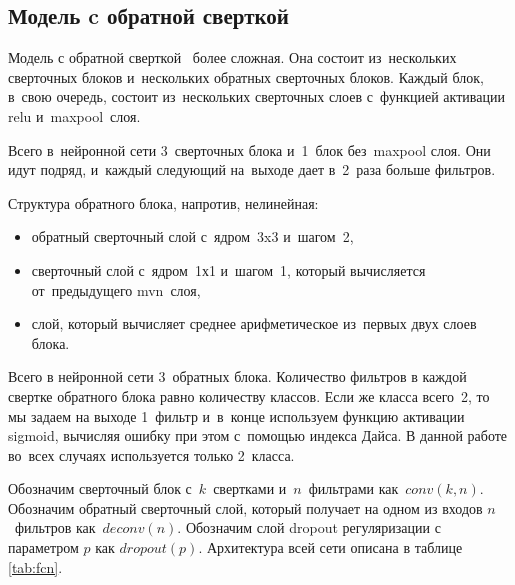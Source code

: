 \subsection{Модель c обратной сверткой}
 
Модель с обратной сверткой~\cite{fcn} более сложная. Она состоит из~нескольких сверточных блоков и~нескольких обратных сверточных блоков. Каждый блок, в~свою очередь, состоит из~нескольких сверточных слоев с~функцией активации relu и~maxpool~слоя. 

Всего в~нейронной сети 3~сверточных блока и~1~блок без~maxpool слоя. Они идут подряд, и~каждый следующий на~выходе дает в~2~раза больше фильтров. 

Структура обратного блока, напротив, нелинейная:

\begin{itemize}
  \item обратный сверточный слой с~ядром~3x3 и~шагом~2,
  \item сверточный слой с~ядром~1х1 и~шагом~1, который вычисляется от~предыдущего mvn~слоя,
  \item слой, который вычисляет среднее арифметическое из~первых двух слоев блока.
\end{itemize}

Всего в нейронной сети 3~обратных блока. Количество фильтров в каждой свертке обратного блока равно количеству классов. Если же класса всего~2, то мы задаем на выходе 1~фильтр и~в~конце используем функцию активации sigmoid, вычисляя ошибку при этом с~помощью индекса Дайса. В данной работе во~всех случаях используется только 2~класса.

Обозначим сверточный блок с~$k$~свертками и~$n$~фильтрами как~$conv(k,n)$. Обозначим обратный сверточный слой, который получает на одном из входов $n$~фильтров как~$deconv(n)$. Обозначим слой dropout регуляризации с параметром $p$ как $dropout(p)$. Архитектура всей сети описана в таблице \ref{tab:fcn}.

